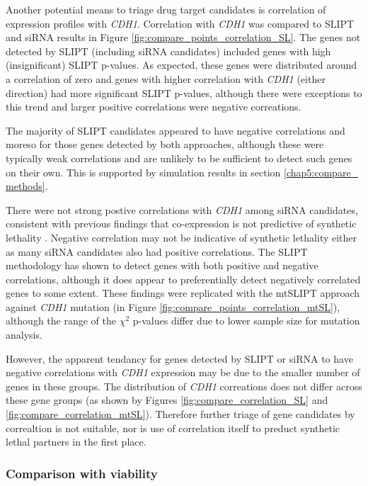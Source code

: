 Another potential means to triage drug target candidates is correlation of expression profiles with \textit{CDH1}. Correlation with \textit{CDH1} was compared to SLIPT and siRNA results in Figure \ref{fig:compare_points_correlation_SL}. The genes not detected by SLIPT (including siRNA candidates) included genes with high (insignificant) SLIPT p-values. As expected, these genes were distributed around a correlation of zero and genes with higher correlation with \textit{CDH1} (either direction) had more significant SLIPT p-values, although there were exceptions to this trend and larger positive correlations were negative correations.

The majority of SLIPT candidates appeared to have negative correlations and moreso for those genes detected by both approaches, although these were typically weak correlations and are unlikely to be sufficient to detect such genes on their own. This is supported by simulation results in section \ref{chap5:compare_ methods}.

There were not strong postive correlations with \textit{CDH1} among siRNA candidates, consistent with previous findings that co-expression is not predictive of synthetic lethality \citep{Jerby2014, Lu2015}. Negative correlation may not be indicative of synthetic lethality either as many siRNA candidates also had positive correlations. The SLIPT methodology has shown to detect genes with both positive and negative correlations, although it does appear to preferentially detect negatively correlated genes to some extent. These findings were replicated with the mtSLIPT approach against \textit{CDH1} mutation (in Figure \ref{fig:compare_points_correlation_mtSL}), although the range of the $\chi^2$ p-values differ due to lower sample size for mutation analysis.

However, the apparent tendancy for genes detected by SLIPT or siRNA to have negative correlations with \textit{CDH1} expression may be due to the smaller number of genes in these groups. The distribution of \textit{CDH1} correations does not differ across these gene groups (as shown by Figures \ref{fig:compare_correlation_SL} and \ref{fig:compare_correlation_mtSL}). Therefore further triage of gene candidates by correaltion is not suitable, nor is use of correlation itself to preduct synthetic lethal partners in the first place.

\FloatBarrier

\subsubsection{Comparison with viability} \label{chapt3:compare_viability}

